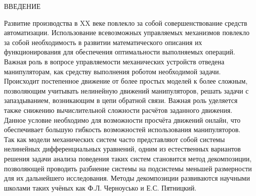 {\centerline{ {\sc ВВЕДЕНИЕ }} \label{prefix}
	Развитие производства в XX веке повлекло за собой совершенствование средств автоматизации. Использование всевозможных управляемых механизмов повлекло за собой необходимость в развитии математического описания их функционирования для обеспечения оптимальности выполняемых операций. Важная роль в вопросе управляемости механических устройств отведена манипуляторам, как средству выполнения роботом необходимой задачи. 
	Происходит постепенное движение от более простых моделей к более сложным, позволяющим учитывать нелинейную движений манипуляторов, решать задачи с запаздыванием, возникающим в цепи обратной связи.
	Важная роль уделяется также снижению вычислительной сложности расчётов заданного движения. Данное условие необходимо для возможности просчёта движений онлайн, что обеспечивает большую гибкость возможностей использования манипуляторов.
	Так как модели механических систем часто представляют собой системы нелинейных дифференциальных уравнений, одним из естественных вариантов решения задачи анализа поведения таких систем становится метод декомпозиции, позволяющей проводить разбиение системы на подсистемы меньшей размерности для их дальнейшего исследования. Методы декомпозиции развиваются научными школами таких учёных как Ф.Л. Черноусько и Е.С. Пятницкий. 
}

